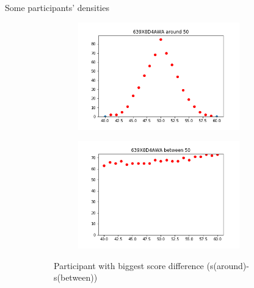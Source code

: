 \documentclass[xcolor=table, hyperref={pdfpagelabels=false}]{beamer}
\begin{document}
\begin{frame}{Some participants' densities}
\begin{minipage}{.6\textwidth}
	\begin{figure}[H]
	\centering
	\begin{subfigure}{\textwidth}
		\begin{subfigure}{.47\textwidth}
			\includegraphics[width=\textwidth]{./images/639X8D4AWA_around_50.png}
		\end{subfigure}
		\begin{subfigure}{.47\textwidth}
			\includegraphics[width=\textwidth]{./images/639X8D4AWA_between_50.png}
		\end{subfigure}
		\caption{Participant with biggest score difference (s(around)-s(between))}
	\end{subfigure}
	\begin{subfigure}{\textwidth}
		\begin{subfigure}{.47\textwidth}

\end{subfigure}
\end{subfigure}
\end{figure}
\end{minipage}
\end{frame}
\end{document}
